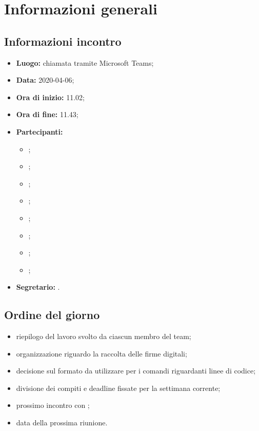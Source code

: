 \section{Informazioni generali}
\subsection{Informazioni incontro}
\begin{itemize}
	\item \textbf{Luogo:} chiamata tramite Microsoft Teams; 
	\item \textbf{Data:} 2020-04-06;
	\item \textbf{Ora di inizio:} 11.02; 
	\item \textbf{Ora di fine:} 11.43; 
	\item \textbf{Partecipanti:}
		\begin{itemize}
			\item \VB; 
			\item \LB; 
			\item \NF; 
			\item \EG; 
			\item \FJ; 
			\item \MP; 
			\item \AS; 
			\item \AZ; 
		\end{itemize}
	\item \textbf{Segretario:} \NF. 
\end{itemize}

\subsection{Ordine del giorno}
\begin{itemize}
	\item riepilogo del lavoro svolto da ciascun membro del team;
	\item organizzazione riguardo la raccolta delle firme digitali;
	\item decisione sul formato da utilizzare per i comandi riguardanti linee di codice;
	\item divisione dei compiti e deadline fissate per la settimana corrente;
	\item prossimo incontro con \Proponente{};
	\item data della prossima riunione.
\end{itemize}
